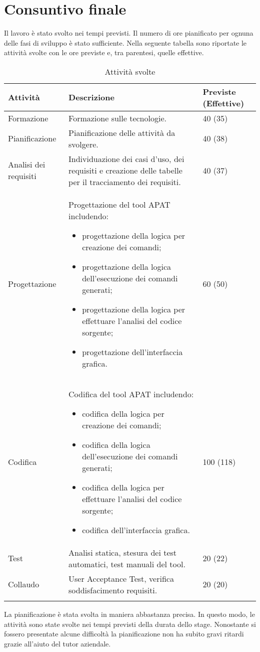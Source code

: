 


\section{Consuntivo finale}\label{sec:consuntivo-finale}
Il lavoro è stato svolto nei tempi previsti.
Il numero di ore pianificato per ognuna delle fasi di sviluppo è stato sufficiente.
Nella seguente tabella sono riportate le attività svolte con le ore previste e, tra parentesi, quelle effettive.

\begin{longtable}{|C{3cm}|C{8cm}|C{2cm}|}
    \hline
    \textbf{Attività} &
    \textbf{Descrizione} &
    \textbf{Previste} (\textbf{Effettive}) \\\hline
    Formazione     & Formazione sulle tecnologie.
    & 40 (35) \\\hline
    Pianificazione & Pianificazione delle attività da svolgere.
    & 40 (38)    \\\hline
    Analisi dei requisiti & Individuazione dei casi d'uso, dei requisiti e creazione delle tabelle per il tracciamento dei requisiti.
    & 40 (37) \\\hline

    Progettazione & Progettazione del tool APAT includendo:
    \begin{itemize}%
        \item progettazione della logica per creazione dei comandi;
        \item progettazione della logica dell'esecuzione dei comandi generati;
        \item progettazione della logica per effettuare l'analisi del codice sorgente;
        \item progettazione dell'interfaccia grafica.
    \end{itemize}
    &60 (50)\\\hline
    Codifica & Codifica del tool APAT includendo:
    \begin{itemize}%
        \item codifica della logica per creazione dei comandi;
        \item codifica della logica dell'esecuzione dei comandi generati;
        \item codifica della logica per effettuare l'analisi del codice sorgente;
        \item codifica dell'interfaccia grafica.
    \end{itemize}
    & 100 (118) \\\hline
    Test           & Analisi statica, stesura dei test automatici, test manuali del tool.
    & 20 (22)   \\\hline
    Collaudo       & User Acceptance Test, verifica soddisfacimento requisiti.
    & 20 (20)    \\\hline
    \caption{Attività svolte}
\end{longtable}

La pianificazione è stata svolta in maniera abbastanza precisa.
In questo modo, le attività sono state svolte nei tempi previsti della durata dello stage.
Nonostante si fossero presentate alcune difficoltà la pianificazione non ha subito gravi ritardi grazie all'aiuto del tutor aziendale.
